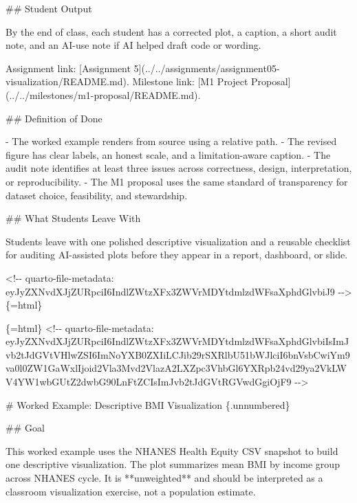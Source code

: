 \documentclass[
  letterpaper,
  DIV=11,
  numbers=noendperiod,
  oneside]{scrreprt}
\newenvironment{Shaded}{\begin{snugshade}}{\end{snugshade}}
\newcommand{\CommentTok}[1]{\textcolor[rgb]{0.37,0.37,0.37}{#1}}
\newcommand{\FunctionTok}[1]{\textcolor[rgb]{0.28,0.35,0.67}{#1}}
\newcommand{\InformationTok}[1]{\textcolor[rgb]{0.37,0.37,0.37}{#1}}
\newcommand{\NormalTok}[1]{\textcolor[rgb]{0.00,0.23,0.31}{#1}}
\newcommand{\OtherTok}[1]{\textcolor[rgb]{0.00,0.23,0.31}{#1}}
\newcommand{\SpecialStringTok}[1]{\textcolor[rgb]{0.13,0.47,0.30}{#1}}
\begin{document}
\begin{Shaded}
\begin{Highlighting}[numbers=left,,]
\FunctionTok{\#\# Student Output}

\NormalTok{By the end of class, each student has a corrected plot, a caption, a short audit note, and an AI{-}use note if AI helped draft code or wording.}

\NormalTok{Assignment link: }\CommentTok{[}\OtherTok{Assignment 5}\CommentTok{](../../assignments/assignment05{-}visualization/README.md)}\NormalTok{. Milestone link: }\CommentTok{[}\OtherTok{M1 Project Proposal}\CommentTok{](../../milestones/m1{-}proposal/README.md)}\NormalTok{.}

\FunctionTok{\#\# Definition of Done}

\SpecialStringTok{{-} }\NormalTok{The worked example renders from source using a relative path.}
\SpecialStringTok{{-} }\NormalTok{The revised figure has clear labels, an honest scale, and a limitation{-}aware caption.}
\SpecialStringTok{{-} }\NormalTok{The audit note identifies at least three issues across correctness, design, interpretation, or reproducibility.}
\SpecialStringTok{{-} }\NormalTok{The M1 proposal uses the same standard of transparency for dataset choice, feasibility, and stewardship.}

\FunctionTok{\#\# What Students Leave With}

\NormalTok{Students leave with one polished descriptive visualization and a reusable checklist for auditing AI{-}assisted plots before they appear in a report, dashboard, or slide.}


\InformationTok{\textasciigrave{}\textless{}!{-}{-} quarto{-}file{-}metadata: eyJyZXNvdXJjZURpciI6IndlZWtzXFx3ZWVrMDYtdmlzdWFsaXphdGlvbiJ9 {-}{-}\textgreater{}\textasciigrave{}}\NormalTok{\{=html\}}

\InformationTok{\textasciigrave{}\textasciigrave{}\textasciigrave{}\{=html\}}
\InformationTok{\textless{}!{-}{-} quarto{-}file{-}metadata: eyJyZXNvdXJjZURpciI6IndlZWtzXFx3ZWVrMDYtdmlzdWFsaXphdGlvbiIsImJvb2tJdGVtVHlwZSI6ImNoYXB0ZXIiLCJib29rSXRlbU51bWJlciI6bnVsbCwiYm9va0l0ZW1GaWxlIjoid2Vla3Mvd2VlazA2LXZpc3VhbGl6YXRpb24vd29ya2VkLWV4YW1wbGUtZ2dwbG90LnFtZCIsImJvb2tJdGVtRGVwdGgiOjF9 {-}{-}\textgreater{}}
\InformationTok{\textasciigrave{}\textasciigrave{}\textasciigrave{}}

\FunctionTok{\# Worked Example: Descriptive BMI Visualization \{.unnumbered\}}


\FunctionTok{\#\# Goal}

\NormalTok{This worked example uses the NHANES Health Equity CSV snapshot to build one descriptive visualization. The plot summarizes mean BMI by income group across NHANES cycle. It is **unweighted** and should be interpreted as a classroom visualization exercise, not a population estimate.}



\end{Highlighting}
\end{Shaded}
\end{document}
